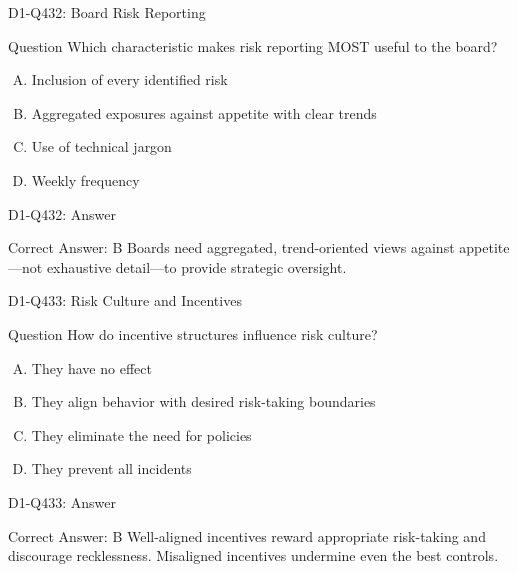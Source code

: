 \documentclass{beamer}
\begin{document}
\begin{frame}{D1-Q432: Board Risk Reporting}
	\begin{block}{Question}
		Which characteristic makes risk reporting MOST useful to the board?
	\end{block}
	\begin{enumerate}[(A)]
		\item Inclusion of every identified risk
		\item Aggregated exposures against appetite with clear trends
		\item Use of technical jargon
		\item Weekly frequency
	\end{enumerate}
\end{frame}
\begin{frame}{D1-Q432: Answer}
	\begin{block}{Correct Answer: B}
		Boards need aggregated, trend-oriented views against appetite—not exhaustive detail—to provide strategic oversight.
	\end{block}
\end{frame}

\begin{frame}{D1-Q433: Risk Culture and Incentives}
	\begin{block}{Question}
		How do incentive structures influence risk culture?
	\end{block}
	\begin{enumerate}[(A)]
		\item They have no effect
		\item They align behavior with desired risk-taking boundaries
		\item They eliminate the need for policies
		\item They prevent all incidents
	\end{enumerate}
\end{frame}
\begin{frame}{D1-Q433: Answer}
	\begin{block}{Correct Answer: B}
		Well-aligned incentives reward appropriate risk-taking and discourage recklessness. Misaligned incentives undermine even the best controls.
	\end{block}
\end{frame}
\end{document}
